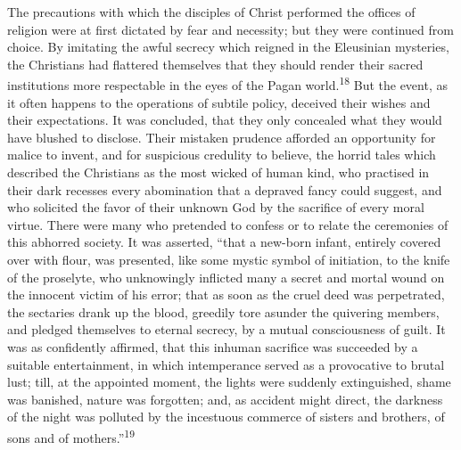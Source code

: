 



The precautions with which the disciples of Christ performed the
offices of religion were at first dictated by fear and necessity;
but they were continued from choice. By imitating the awful
secrecy which reigned in the Eleusinian mysteries, the Christians
had flattered themselves that they should render their sacred
institutions more respectable in the eyes of the Pagan world.\textsuperscript{18}
But the event, as it often happens to the operations of subtile
policy, deceived their wishes and their expectations. It was
concluded, that they only concealed what they would have blushed
to disclose. Their mistaken prudence afforded an opportunity for
malice to invent, and for suspicious credulity to believe, the
horrid tales which described the Christians as the most wicked of
human kind, who practised in their dark recesses every
abomination that a depraved fancy could suggest, and who
solicited the favor of their unknown God by the sacrifice of
every moral virtue. There were many who pretended to confess or
to relate the ceremonies of this abhorred society. It was
asserted, “that a new-born infant, entirely covered over with
flour, was presented, like some mystic symbol of initiation, to
the knife of the proselyte, who unknowingly inflicted many a
secret and mortal wound on the innocent victim of his error; that
as soon as the cruel deed was perpetrated, the sectaries drank up
the blood, greedily tore asunder the quivering members, and
pledged themselves to eternal secrecy, by a mutual consciousness
of guilt. It was as confidently affirmed, that this inhuman
sacrifice was succeeded by a suitable entertainment, in which
intemperance served as a provocative to brutal lust; till, at the
appointed moment, the lights were suddenly extinguished, shame
was banished, nature was forgotten; and, as accident might
direct, the darkness of the night was polluted by the incestuous
commerce of sisters and brothers, of sons and of mothers.”\textsuperscript{19}

